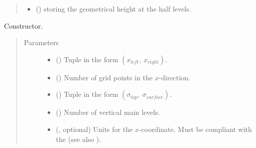 \documentclass[letterpaper,10pt,english]{sphinxmanual}
\begin{document}
\begin{fulllineitems}
\begin{quote}
\begin{description}
\begin{itemize}
\item {} 
 () \textendash{}  storing the geometrical
height at the half levels.

\end{itemize}

\end{description}\end{quote}

\begin{fulllineitems}
\label{\detokenize{api:grids.sigma.Sigma2d.__init__}}
Constructor.
\begin{quote}\begin{description}
\item[{Parameters}] \leavevmode\begin{itemize}
\item {} 
 () \textendash{} Tuple in the form \((x_{left}, ~ x_{right})\).

\item {} 
 () \textendash{} Number of grid points in the \(x\)-direction.

\item {} 
 () \textendash{} Tuple in the form \((\sigma_{top}, ~ \sigma_{surface})\).

\item {} 
 () \textendash{} Number of vertical main levels.

\item {} 
 (, optional) \textendash{} 
Units for the \(x\)-coordinate. Must be compliant
with the  (see also
{\hyperref[\detokenize{api:grids.axis.Axis.__init__}]{}}).



\end{itemize}
\end{description}
\end{quote}
\end{fulllineitems}
\end{fulllineitems}
\end{document}
